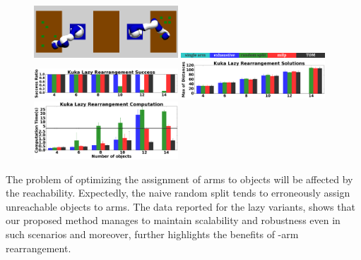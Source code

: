 {\begin{figure}[h]
	\centering
	\includegraphics[width=0.48\textwidth]{figures/reachability}
	\includegraphics[width=0.48\textwidth]{figures/results/labels}
	\includegraphics[width=0.48\textwidth]{figures/results/5_kuka_lazy_ms_success.png}
	\includegraphics[width=0.48\textwidth]{figures/results/5_kuka_lazy_ms_cost.png}
	\includegraphics[width=0.48\textwidth]{figures/results/5_kuka_lazy_ms_time.png}
	\caption{  }
	\label{fig:reachability_benchmark}
	    \vspace{-.2in}
\end{figure}

The problem of optimizing the assignment of arms to objects will be affected by the reachability. Expectedly, the naive random split tends to erroneously assign unreachable objects to arms. The data reported for the lazy variants, shows that our proposed method manages to maintain scalability and robustness even in such scenarios and moreover, further highlights the benefits of \dual-arm rearrangement.


}

